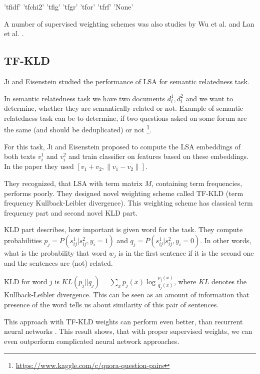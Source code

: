     
    'tfidf'
'tfchi2'
'tfig'
'tfgr'
'tfor'
'tfrf'
'None'

    
    
    A number of supervised weighting schemes was also studies by Wu et al. \cite{wu2017balancing} %
    and Lan et al. \cite{lan2009supervised}. %


    \subsection{TF-KLD}
        Ji and Eisenstein \cite{ji2013discriminative} %
        studied the performance of LSA for semantic relatedness task.
        
        In semantic relatedness task we have two documents $d_i^1, d_i^2$ and we want to determine, whether they are semantically related or not. 
        Example of semantic relatedness task can be to determine, if two questions asked on some forum are the same (and should be deduplicated) or not \footnote{\url{https://www.kaggle.com/c/quora-question-pairs}}.
        
        For this task, Ji and Eisenstein proposed to compute the LSA embeddings of both texts $v_i^1$ and $v_i^2$ and train classifier on features based on these embeddings.
        In the paper they used $[v_1 + v_2, \| v_1- v_2 \|]$.
        
        They recognized, that LSA with term matrix $M$, containing term frequencies, performs poorly. 
        They designed novel weighting scheme called TF-KLD (term frequency Kullback-Leibler divergence). 
        This weighting scheme has classical term frequency part and second novel KLD part.
        
        KLD part describes, how important is given word for the task.
        They compute probabilities $p_j = P(s_{ij}^1| s_{ij}^2, y_i=1)$ and $q_j = P(s_{ij}^1| s_{ij}^2, y_i=0)$.
        In other words, what is the probability that word $w_j$ is in the first sentence if it is the second one and the sentences are (not) related.
        
        KLD for word $j$ is $KL(p_j || q_j) = \sum_x p_j(x) \log \frac{p_j(x)}{q_j(x)}$, where $KL$ denotes the Kullback-Leibler divergence.
        This can be seen as an amount of information that presence of the word tells us about similarity of this pair of sentences. 
    
        This approach with TF-KLD weights can perform even better, than recurrent neural networks \cite{conneau2017supervised}.
        This result shows, that with proper supervised weights, we can even outperform complicated neural network approaches.
        

